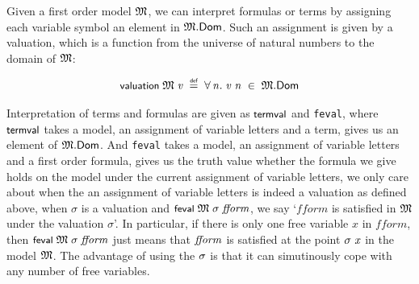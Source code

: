 \documentclass[letterpaper]{article}
\renewcommand{\HOLConst}[1]{{\textsf{\upshape\small #1}}}
\renewcommand{\HOLinline}[1]{\ensuremath{#1}}
\newenvironment{holmath}{\begin{displaymath}\begin{array}{l}}{\end{array}\end{displaymath}\ignorespacesafterend}
\begin{document}
Given a first order model \HOLinline{\HOLFreeVar{\ensuremath{\mathfrak{M}}}}, we can interpret formulas or terms by assigning each variable symbol an element in \HOLinline{\HOLFreeVar{\ensuremath{\mathfrak{M}}}.\HOLFieldName{Dom}}. Such an assignment is given by a valuation, which is a function from the universe of natural numbers to the domain of \HOLinline{\HOLFreeVar{\ensuremath{\mathfrak{M}}}}:

\begin{holmath}
  \HOLConst{valuation}\;\HOLFreeVar{\ensuremath{\mathfrak{M}}}\;\HOLFreeVar{v}\;\HOLSymConst{\HOLTokenDefEquality{}}\;\HOLSymConst{\HOLTokenForall{}}\HOLBoundVar{n}.\;\HOLFreeVar{v}\;\HOLBoundVar{n}\;\HOLSymConst{\HOLTokenIn{}}\;\HOLFreeVar{\ensuremath{\mathfrak{M}}}.\HOLFieldName{Dom}
\end{holmath} 

Interpretation of terms and formulas are given as \HOLinline{\HOLConst{termval}} and \texttt{feval}, where \HOLinline{\HOLConst{termval}} takes a model, an assignment of variable letters and a term, gives us an element of \HOLinline{\HOLFreeVar{\ensuremath{\mathfrak{M}}}.\HOLFieldName{Dom}}. And \texttt{feval} takes a model, an assignment of variable letters and a first order formula, gives us the truth value whether the formula we give holds on the model under the current assignment of variable letters, we only care about when the an assignment of variable letters is indeed a valuation as defined above, when $\sigma$ is a valuation and \HOLinline{\HOLConst{feval}\;\HOLFreeVar{\ensuremath{\mathfrak{M}}}\;\HOLFreeVar{\ensuremath{\sigma}}\;\HOLFreeVar{fform}}, we say `$fform$ is satisfied in \HOLinline{\HOLFreeVar{\ensuremath{\mathfrak{M}}}} under the valuation $\sigma$'. In particular, if there is only one free variable $x$ in $fform$, then \HOLinline{\HOLConst{feval}\;\HOLFreeVar{\ensuremath{\mathfrak{M}}}\;\HOLFreeVar{\ensuremath{\sigma}}\;\HOLFreeVar{fform}} just means that \HOLinline{\HOLFreeVar{fform}} is satisfied at the point \HOLinline{\HOLFreeVar{\ensuremath{\sigma}}\;\HOLFreeVar{x}} in the model \HOLinline{\HOLFreeVar{\ensuremath{\mathfrak{M}}}}. The advantage of using the \HOLinline{\HOLFreeVar{\ensuremath{\sigma}}} is that it can simutinously cope with any number of free variables. 
\end{document}
